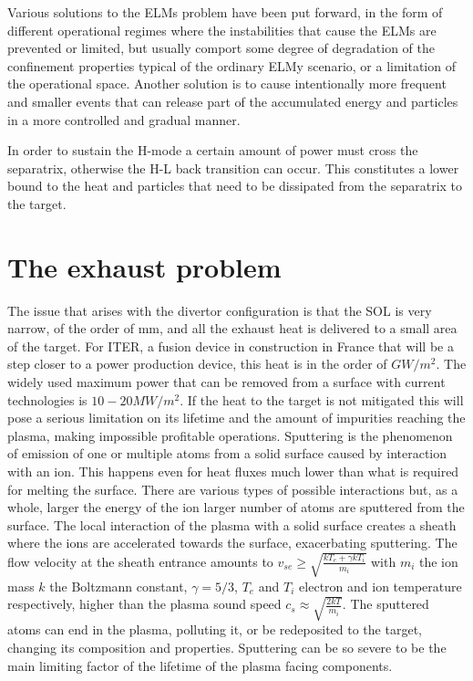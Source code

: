 Various solutions to the ELMs problem have been put forward, in the form of different operational regimes where the instabilities that cause the ELMs are prevented or limited, but usually comport some degree of degradation of the confinement properties typical of the ordinary ELMy scenario, or a limitation of the operational space. Another solution is to 
cause intentionally more frequent and smaller events that can release part of the accumulated energy and particles in a more controlled and gradual manner.\cite{Leonard2014}

In order to sustain the H-mode a certain amount of power must cross the separatrix, otherwise the H-L back transition can occur. This constitutes a lower bound to the heat and particles that need to be dissipated from the separatrix to the target.

\section{The exhaust problem}

The issue that arises with the divertor configuration is that the SOL is  very narrow, of the order of mm\cite{Faitsch2021,Silvagni2020}, and all the exhaust heat is delivered to a small area of the target. For ITER, a fusion device in construction in France that will be a step closer to a power production device, this heat is in the order of $GW/m^2$.\cite{Kuang2020} The widely used maximum power that can be removed from a surface with current technologies is $10-20MW/m^2$.\cite{Pitts2019,Lipschultz2018} If the heat to the target is not mitigated this will pose a serious limitation on its lifetime and the amount of impurities reaching the plasma, making impossible profitable operations. 
Sputtering is the phenomenon of emission of one or multiple atoms from a solid surface caused by interaction with an ion. This happens even for heat fluxes much lower than what is required for melting the surface.\cite{Wiesen2017a} There are various types of possible interactions but, as a whole, larger the energy of the ion larger number of atoms are sputtered from the surface. The local interaction of the plasma with a solid surface creates a sheath where the ions are accelerated towards the surface, exacerbating sputtering. The flow velocity at the sheath entrance amounts to $v_{se} \geq \sqrt{\frac{kT_e + \gamma kT_i}{m_i}}$ with $m_i$ the ion mass $k$ the Boltzmann constant, $\gamma=5/3$, $T_e$ and $T_i$ electron and ion temperature respectively, higher than the plasma sound speed $c_s \approx \sqrt{\frac{2kT}{m_i}}$. The sputtered atoms can end in the plasma, polluting it, or be redeposited to the target, changing its composition and properties. Sputtering can be so severe to be the main limiting factor of the lifetime of the plasma facing components.

